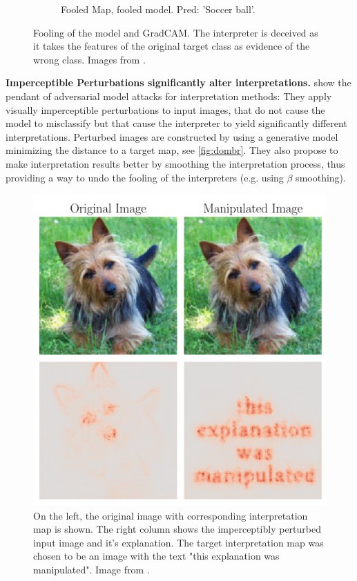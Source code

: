 \documentclass[sigconf]{acmart}
\newcommand{\mypar}[1]{\vspace{0.2cm}\noindent\textbf{#1}}
\begin{document}
\begin{figure}[ht]
\begin{subfigure}{0.32\linewidth}
      \caption{\scriptsize{Fooled Map, fooled \newline model. Pred: 'Soccer ball'.}}
      \label{fig:patch_fooled}
    \end{subfigure}
    \caption{Fooling of the model and GradCAM. The interpreter is deceived as it takes the features of the original target class as evidence of the wrong class. Images from \cite{subramanya2019fooling}.}\label{fig:patch_fooling}
    \vspace{-0.3cm}
\end{figure}

\mypar{Imperceptible Perturbations significantly alter interpretations. }
\cite{dombrowski2019explanations} show the pendant of adversarial model attacks for interpretation methods: They apply visually imperceptible perturbations to input images, that do not cause the model to misclassify but that cause the interpreter to yield significantly different interpretations. Perturbed images are constructed by using a generative model minimizing the distance to a target map, see \autoref{fig:dombr}. They also propose to make interpretation results better by smoothing the interpretation process, thus providing a way to undo the fooling of the interpreters (e.g. using $\beta$ smoothing).

\begin{figure}[ht]
    \centering
    \includegraphics[width=0.8\linewidth]{figures/dombr.png}
    \caption{On the left, the original image with corresponding interpretation map is shown. The right column shows the imperceptibly perturbed input image and it's explanation. The target interpretation map was chosen to be an image with the text "this explanation was manipulated". Image from \cite{dombrowski2019explanations}.}\label{fig:dombr}
    \vspace{-0.3cm}
\end{figure}
\end{document}
